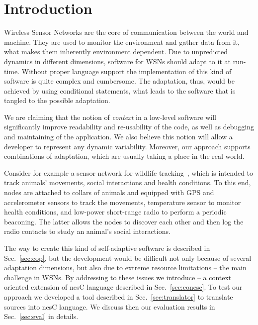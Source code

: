 \section{Introduction}

Wireless Sensor Networks are the core of communication between the world and
machine. They are used to monitor the environment and gather data from it, what
makes them inherently environment dependent. Due to unpredicted dynamics in
different dimensions, software for WSNs should adapt to it at run-time. Without
proper language support the implementation of this kind of software is quite
complex and cumbersome. The adaptation, thus, would be achieved by using
conditional statements, what leads to the software that is tangled to the
possible adaptation.

We are claiming that the notion of \emph{context} in a low-level software will
significantly improve readability and re-usability of the code, as well as
debugging and maintaining of the application. We also believe this notion will
allow a developer to represent any dynamic variability. Moreover, our approach
supports combinations of adaptation, which are usually taking a place in the
real world.

Consider for example a sensor network for wildlife tracking~\cite{pasztor10},
which is intended to track animals' movements, social interactions and health
conditions. To this end, nodes are attached to collars of animals and equipped
with GPS and accelerometer sensors to track the movements, temperature sensor
to monitor health conditions, and low-power short-range radio to perform a
periodic beaconing. The latter allows the nodes to discover each other and then
log the radio contacts to study an animal's social interactions.

The way to create this kind of self-adaptive software is described in
Sec.~\ref{sec:cop}, but the development would be difficult not only because of
several adaptation dimensions, but also due to extreme resource limitations --
the main challenge in WSNs. By addressing to these issues we introduce \conesc
-- a context oriented extension of nesC language described in
Sec.~\ref{sec:conesc}. To test our approach we developed a tool described in
Sec.~\ref{sec:translator} to translate \conesc sources into nesC language. We
discuss then our evaluation results in Sec.~\ref{sec:eval} in details.
